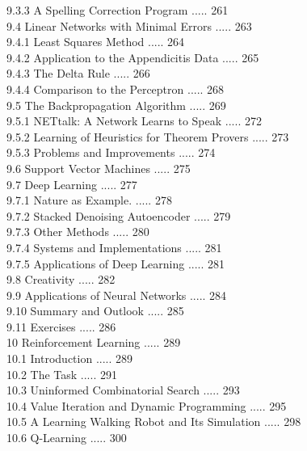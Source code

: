 \documentclass[10pt]{book}
\begin{document}
9.3.3 A Spelling Correction Program ..... 261\\
9.4 Linear Networks with Minimal Errors ..... 263\\
9.4.1 Least Squares Method ..... 264\\
9.4.2 Application to the Appendicitis Data ..... 265\\
9.4.3 The Delta Rule ..... 266\\
9.4.4 Comparison to the Perceptron ..... 268\\
9.5 The Backpropagation Algorithm ..... 269\\
9.5.1 NETtalk: A Network Learns to Speak ..... 272\\
9.5.2 Learning of Heuristics for Theorem Provers ..... 273\\
9.5.3 Problems and Improvements ..... 274\\
9.6 Support Vector Machines ..... 275\\
9.7 Deep Learning ..... 277\\
9.7.1 Nature as Example. ..... 278\\
9.7.2 Stacked Denoising Autoencoder ..... 279\\
9.7.3 Other Methods ..... 280\\
9.7.4 Systems and Implementations ..... 281\\
9.7.5 Applications of Deep Learning ..... 281\\
9.8 Creativity ..... 282\\
9.9 Applications of Neural Networks ..... 284\\
9.10 Summary and Outlook ..... 285\\
9.11 Exercises ..... 286\\
10 Reinforcement Learning ..... 289\\
10.1 Introduction ..... 289\\
10.2 The Task ..... 291\\
10.3 Uninformed Combinatorial Search ..... 293\\
10.4 Value Iteration and Dynamic Programming ..... 295\\
10.5 A Learning Walking Robot and Its Simulation ..... 298\\
10.6 Q-Learning ..... 300\\
\end{document}
